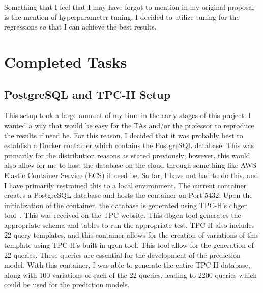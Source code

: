 \documentclass[sigconf]{acmart}
\begin{document}
Something that I feel that I may have forgot to mention in my original proposal is the mention of hyperparameter tuning. I decided to utilize tuning for 
the regressions so that I can achieve the best results.

\section{Completed Tasks}
\subsection{PostgreSQL and TPC-H Setup}
This setup took a large amount of my time in the early stages of this project. I wanted a way that would be
easy for the TAs and/or the professor to reproduce the results if need be. For this reason, I decided that it was probably
best to establish a Docker container which contains the PostgreSQL database. This was primarily for the distribution reasons
as stated previously; however, this would also allow for me to host the database on the cloud through something like AWS Elastic Container Service (ECS)
if need be. So far, I have not had to do this, and I have primarily restrained this to a local environment. The current container creates a PostgreSQL database
and hosts the container on Port $5432$. Upon the initialization of the container, the database is generated using TPC-H's dbgen tool~\cite{tpch}. This
was received on the TPC website. This dbgen tool generates the appropriate schema and tables to run the appropriate test. TPC-H also includes $22$ query templates,
and this container allows for the creation of variations of this template using TPC-H's built-in qgen tool. This tool allow for the generation of 22 queries. 
These queries are essential for the development of the prediction model. With this container, I was able to generate the entire TPC-H database, along with 100 variations
of each of the 22 queries, leading to 2200 queries which could be used for the prediction models.
\end{document}

